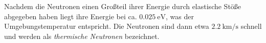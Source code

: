 Nachdem die Neutronen einen Großteil ihrer Energie durch elastische Stöße abgegeben haben liegt ihre Energie bei ca. $\qty{0.025}{\electronvolt}$, was der Umgebungstemperatur 
entspricht. Die Neutronen sind dann etwa $\qty{2.2}{\kilo\metre\per\second}$ schnell und werden als \textit{thermische Neutronen} bezeichnet. 
